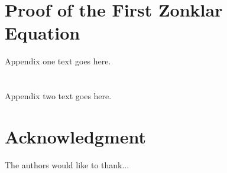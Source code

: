 \documentclass[journal]{IEEEtran}
\begin{document}
\appendices
\section{Proof of the First Zonklar Equation}
Appendix one text goes here.

\section{}
Appendix two text goes here.


\section*{Acknowledgment}


The authors would like to thank...


\ifCLASSOPTIONcaptionsoff
  \newpage
\fi





%
%
%


\end{document}
